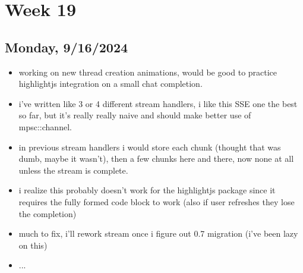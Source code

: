 \newpage
\section{Week 19}

\subsection*{Monday, 9/16/2024}
\begin{itemize}
    \item working on new thread creation animations, would be good to practice
        highlightjs integration on a small chat completion. 
    \item i've written like 3 or 4 different stream handlers, i like this SSE
        one the best so far, but it's really really naive and should make better
        use of mpsc::channel.
    \item in previous stream handlers i would store each chunk (thought that was
        dumb, maybe it wasn't), then a few chunks here and there, now none at
        all unless the stream is complete.
    \item i realize this probably doesn't work for the highlightjs package since
        it requires the fully formed code block to work (also if user refreshes
        they lose the completion)
    \item much to fix, i'll rework stream once i figure out 0.7 migration (i've
        been lazy on this)
    \item ...
\end{itemize}
